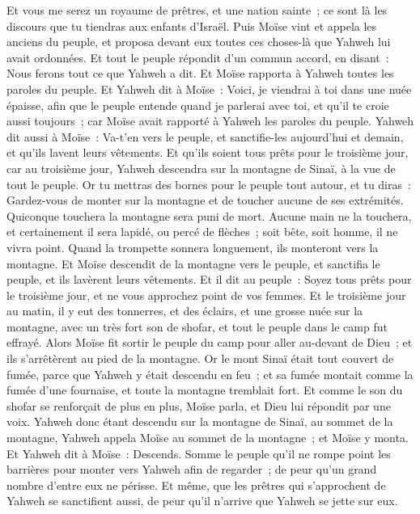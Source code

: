 \begin{multicols}{2}
Et vous me serez un royaume de prêtres, et une nation sainte~; ce sont là les discours que tu tiendras aux enfants d'Israël.
Puis Moïse vint et appela les anciens du peuple, et proposa devant eux toutes ces choses-là que Yahweh lui avait ordonnées.
Et tout le peuple répondit d'un commun accord, en disant~: Nous ferons tout ce que Yahweh a dit. Et Moïse rapporta à Yahweh toutes les paroles du peuple.
Et Yahweh dit à Moïse~: Voici, je viendrai à toi dans une nuée épaisse, afin que le peuple entende quand je parlerai avec toi, et qu'il te croie aussi toujours~; car Moïse avait rapporté à Yahweh les paroles du peuple.
Yahweh dit aussi à Moïse~: Va-t'en vers le peuple, et sanctifie-les aujourd'hui et demain, et qu'ils lavent leurs vêtements.
Et qu'ils soient tous prêts pour le troisième jour, car au troisième jour, Yahweh descendra sur la montagne de Sinaï, à la vue de tout le peuple.
Or tu mettras des bornes pour le peuple tout autour, et tu diras~: Gardez-vous de monter sur la montagne et de toucher aucune de ses extrémités. Quiconque touchera la montagne sera puni de mort.
Aucune main ne la touchera, et certainement il sera lapidé, ou percé de flèches~; soit bête, soit homme, il ne vivra point. Quand la trompette sonnera longuement, ils monteront vers la montagne.
Et Moïse descendit de la montagne vers le peuple, et sanctifia le peuple, et ils lavèrent leurs vêtements.
Et il dit au peuple~: Soyez tous prêts pour le troisième jour, et ne vous approchez point de vos femmes.
Et le troisième jour au matin, il y eut des tonnerres, et des éclairs, et une grosse nuée sur la montagne, avec un très fort son de shofar, et tout le peuple dans le camp fut effrayé.
Alors Moïse fit sortir le peuple du camp pour aller au-devant de Dieu~; et ils s'arrêtèrent au pied de la montagne.
Or le mont Sinaï était tout couvert de fumée, parce que Yahweh y était descendu en feu~; et sa fumée montait comme la fumée d'une fournaise, et toute la montagne tremblait fort.
Et comme le son du shofar se renforçait de plus en plus, Moïse parla, et Dieu lui répondit par une voix.
Yahweh donc étant descendu sur la montagne de Sinaï, au sommet de la montagne, Yahweh appela Moïse au sommet de la montagne~; et Moïse y monta.
Et Yahweh dit à Moïse~: Descends. Somme le peuple qu'il ne rompe point les barrières pour monter vers Yahweh afin de regarder~; de peur qu'un grand nombre d'entre eux ne périsse.
Et même, que les prêtres qui s'approchent de Yahweh se sanctifient aussi, de peur qu'il n'arrive que Yahweh se jette sur eux.

\end{multicols}
